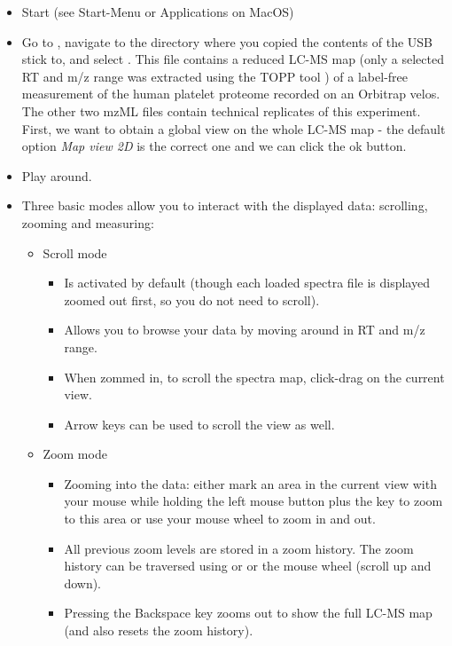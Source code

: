 \begin{itemize}
\item Start  (see Start-Menu or Applications on MacOS)
\item Go to , navigate to the directory where you copied the contents of the USB stick to,
      and select
      . This file contains a reduced LC-MS map (only a selected RT and m/z range
      was extracted using the TOPP tool ) of a label-free measurement of the human platelet proteome recorded on an Orbitrap velos.
      The other two mzML files contain technical replicates of this experiment.
      First, we want to obtain a global view on the whole LC-MS map - the default option \textit{Map view 2D} is the correct one and we can click the ok button. 
\item Play around.
\item Three basic modes allow you to interact with the displayed data: scrolling, zooming and measuring:
    \begin{itemize}
    \item Scroll mode
        \begin{itemize}
        \item Is activated by default (though each loaded spectra file is displayed zoomed out first, so you do not need to scroll).
        \item Allows you to browse your data by moving around in RT and m/z range.
        \item When zommed in, to scroll the spectra map, click-drag on the current view.
        \item Arrow keys can be used to scroll the view as well.
        \end{itemize}
    \item Zoom mode
        \begin{itemize}
        \item Zooming into the data: either mark an area in the current view with your mouse while holding the left mouse
              button plus the \keys{\ctrl} key to zoom to this area
              or use your mouse wheel to zoom in and out.
        \item All previous zoom levels are stored in a zoom history. The zoom history can be traversed using
              \keys[,]{\ctrl,+} or \keys[,]{\ctrl,-} or the mouse wheel (scroll up and down).
        \item Pressing the Backspace key zooms out to show the full LC-MS map (and also resets the zoom history).

\end{itemize}
\end{itemize}
\end{itemize}
